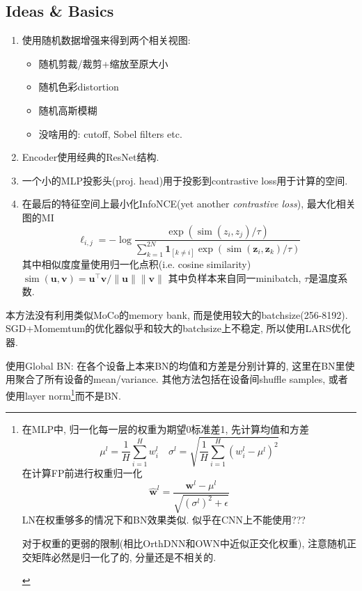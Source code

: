 \documentclass{article}
\begin{document}
\subsection{Ideas \& Basics}

\begin{enumerate}
    \item 使用随机数据增强来得到两个相关视图:
    \begin{itemize}
        \item 随机剪裁/裁剪+缩放至原大小
        \item 随机色彩distortion
        \item 随机高斯模糊
        \item 没啥用的: cutoff, Sobel filters etc.
    \end{itemize}
    \item Encoder使用经典的ResNet结构.
    \item 一个小的MLP投影头(proj. head)用于投影到contrastive loss用于计算的空间.
    \item 在最后的特征空间上最小化InfoNCE(yet another \textit{contrastive loss}), 最大化相关图的MI
    \begin{equation}
        \ell_{i, j}=-\log \frac{\exp \left(\operatorname{sim}\left(z_{i}, z_{j}\right) / \tau\right)}{\sum_{k=1}^{2 N} \bm{1}_{[k \neq i]} \exp \left(\operatorname{sim}\left(\boldsymbol{z}_{i}, \boldsymbol{z}_{k}\right) / \tau\right)}
    \end{equation}
    其中相似度度量使用归一化点积(i.e. cosine similarity)$\operatorname{sim}(\boldsymbol{u}, \boldsymbol{v})=\boldsymbol{u}^{\top} \boldsymbol{v} /\|\boldsymbol{u}\|\|\boldsymbol{v}\|$
    其中负样本来自同一minibatch, $\tau$是温度系数.
\end{enumerate}

本方法没有利用类似MoCo的memory bank, 而是使用较大的batchsize(256-8192). SGD+Momemtum的优化器似乎和较大的batchsize上不稳定, 所以使用LARS优化器. 

使用Global BN: 在各个设备上本来BN的均值和方差是分别计算的, 这里在BN里使用聚合了所有设备的mean/variance. 其他方法包括在设备间shuffle samples, 或者使用layer norm\footnote{
    在MLP中, 归一化每一层的权重为期望0标准差1, 先计算均值和方差
    \begin{equation}
        \mu^{l}=\frac{1}{H} \sum_{i=1}^{H} w_{i}^{l} \quad \sigma^{l}=\sqrt{\frac{1}{H} \sum_{i=1}^{H}\left(w_{i}^{l}-\mu^{l}\right)^{2}}
    \end{equation}
    在计算FP前进行权重归一化
    \begin{equation}
        \hat{\mathbf{w}}^{l}=\frac{\mathbf{w}^{l}-\mu^{l}}{\sqrt{\left(\sigma^{l}\right)^{2}+\epsilon}}
    \end{equation}
    LN在权重够多的情况下和BN效果类似. 似乎在CNN上不能使用???
    \begin{remark}
        对于权重的更弱的限制(相比OrthDNN和OWN中近似正交化权重), 注意随机正交矩阵必然是归一化了的, 分量还是不相关的.
    \end{remark}
}而不是BN.
\end{document}
